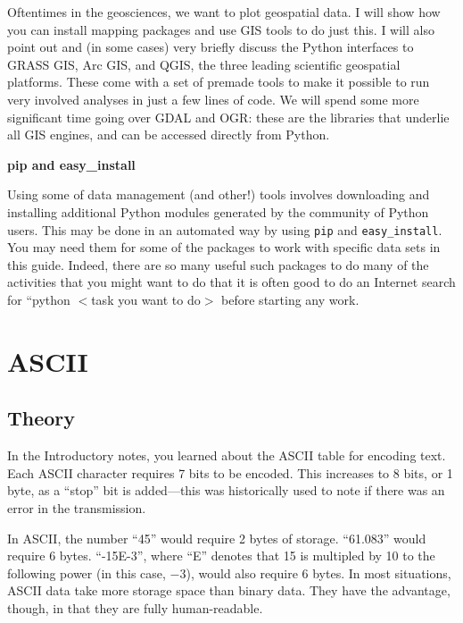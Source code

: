 \documentclass[a4paper,10pt]{scrartcl}
\begin{document}
Oftentimes in the geosciences, we want to plot geospatial data. I will show how you can install mapping packages and use GIS tools to do just this. I will also point out and (in some cases) very briefly discuss the Python interfaces to GRASS GIS, Arc GIS, and QGIS, the three leading scientific geospatial platforms. These come with a set of premade tools to make it possible to run very involved analyses in just a few lines of code. We will spend some more significant time going over GDAL and OGR: these are the libraries that underlie all GIS engines, and can be accessed directly from Python.

\begin{framed}
\noindent\textbf{pip and easy\_install}

Using some of data management (and other!) tools involves downloading and installing additional Python modules generated by the community of Python users. This may be done in an automated way by using \lstinline{pip} and \lstinline{easy_install}. You may need them for some of the packages to work with specific data sets in this guide. Indeed, there are so many useful such packages to do many of the activities that you might want to do that it is often good to do an Internet search for ``python $<$task you want to do$>$ before starting any work.
\end{framed}

\section{ASCII}

\subsection{Theory}

In the Introductory notes, you learned about the ASCII table for encoding text. Each ASCII character requires 7 bits to be encoded. This increases to 8 bits, or 1 byte, as a ``stop'' bit is added---this was historically used to note if there was an error in the transmission.

In ASCII, the number ``45'' would require 2 bytes of storage. ``61.083'' would require 6 bytes. ``-15E-3'', where ``E'' denotes that 15 is multipled by 10 to the following power (in this case, $-3$), would also require 6 bytes. In most situations, ASCII data take more storage space than binary data. They have the advantage, though, in that they are fully human-readable.
\end{document}
